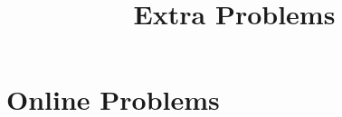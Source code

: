 \documentclass{ximera}
\title{Extra Problems}
\begin{document}
\begin{abstract}
\end{abstract}
\maketitle
\section{Online Problems}





\end{document}
